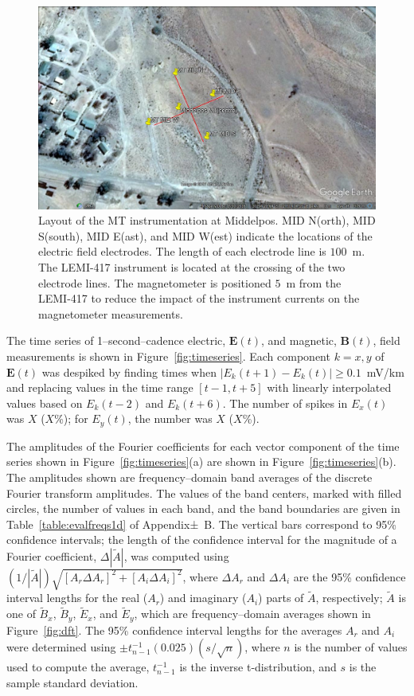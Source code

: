 \documentclass[draft,linenumbers]{agujournal2018}
\begin{document}
\begin{figure}[h]
  \centering
  \includegraphics[width=\textwidth]{figures/site.png}
  \caption{Layout of the MT instrumentation at Middelpos. MID N(orth), MID S(south), MID E(ast), and MID W(est) indicate the locations of the electric field electrodes. The length of each electrode line is $100$~m. The LEMI-417 instrument is located at the crossing of the two electrode lines. The magnetometer is positioned $5$~m from the LEMI-417 to reduce the impact of the instrument currents on the magnetometer measurements. 
}
 \label{fig:site}
\end{figure}

The time series of 1--second--cadence electric, $\mathbf{E}(t)$, and magnetic, $\mathbf{B}(t)$, field measurements is shown in Figure~\ref{fig:timeseries}. Each component $k=x, y$ of $\mathbf{E}(t)$ was despiked by finding times when $|E_k(t+1)-E_k(t)|\ge 0.1$~mV/km and replacing values in the time range $[t-1, t+5]$ with linearly interpolated values based on $E_k(t-2)$ and $E_k(t+6)$. The number of spikes in $E_x(t)$ was $X$ ($X$\%); for $E_y(t)$, the number was $X$ ($X$\%).

The amplitudes of the Fourier coefficients for each vector component of the time series shown in Figure~\ref{fig:timeseries}(a) are shown in Figure~\ref{fig:timeseries}(b). The amplitudes shown are frequency--domain band averages of the discrete Fourier transform amplitudes. The values of the band centers, marked with filled circles, the number of values in each band, and the band boundaries are given in Table~\ref{table:evalfreqs1d} of Appendix±~B. The vertical bars correspond to 95\% confidence intervals; the length of the confidence interval for the magnitude of a Fourier coefficient, $\Delta|\widetilde{A}|$, was computed using $(1/|\widetilde{A}|)\sqrt{[A_r\Delta A_r]^2 + [A_i\Delta A_i]^2}$, where $\Delta A_r$ and $\Delta A_i$ are the 95\% confidence interval lengths for the real ($A_r$) and imaginary ($A_i$) parts of $\widetilde{A}$, respectively; $\widetilde{A}$ is one of $\widetilde{B}_x$, $\widetilde{B}_y$, $\widetilde{E}_x$, and $\widetilde{E}_y$, which are frequency--domain averages shown in Figure~\ref{fig:dft}. The 95\% confidence interval lengths for the averages $A_r$ and $A_i$ were determined using $\pm t^{-1}_{n-1}(0.025) (s/\sqrt{n})$, where $n$ is the number of values used to compute the average, $t^{-1}_{n-1}$ is the inverse t-distribution, and $s$ is the sample standard deviation.
\end{document}
